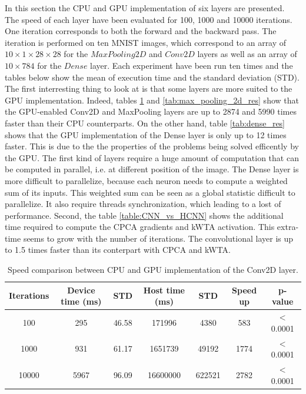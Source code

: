 \documentclass[11pt]{report}
\begin{document}
In this section the CPU and GPU implementation of six layers are presented. The speed of each layer have been evaluated for 100, 1000 and 10000 iterations. One iteration corresponds to both the forward and the backward pass. The iteration is performed on ten MNIST images, which correspond to an array of $10\times1\times28\times28$ for the $MaxPooling2D$ and $Conv2D$ layers as well as an array of $10\times784$ for the $Dense$ layer. Each experiment have been run ten times and the tables below show the mean of execution time and the standard deviation (STD).
\newline
\newline
\noindent The first interresting thing to look at is that some layers are more suited to the GPU implementation. Indeed, tables \ref{tab:conv2d_res} and \ref{tab:max_pooling_2d_res} show that the GPU-enabled Conv2D and MaxPooling layers are up to 2874 and 5990 times faster than their CPU counterparts. On the other hand, table \ref{tab:dense_res} shows that the GPU implementation of the Dense layer is only up to 12 times faster. This is due to the the properties of the problems being solved efficently by the GPU. The first kind of layers require a huge amount of  computation that can be computed in parallel, i.e. at different position of the image. The Dense layer is more difficult to parallelize, because each neuron needs to compute a weighted sum of its inputs. This weighted sum can be seen as a global statistic difficult to parallelize. It also require threads synchronization, which leading to a lost of performance.
\newline
\newline
\noindent Second, the table \ref{table:CNN_vs_HCNN} shows the additional time required to compute the CPCA gradients and kWTA activation. This extra-time seems to grow with the number of iterations. The convolutional layer is up to 1.5 times faster than its conterpart with CPCA and kWTA.

\begin{table}[h!]
\centering
\begin{tabular}{ c | c c | c c | c c }
Iterations & Device time (ms) & STD & Host time (ms) & STD & Speed up & p-value\\
\hline
100   & 295  & 46.58 & 171996   & 4380   & 583 & $<$ 0.0001 \\
1000  & 931  & 61.17 & 1651739  & 49192  & 1774 & $<$ 0.0001 \\
10000 & 5967 & 96.09 & 16600000 & 622521 & 2782 & $<$ 0.0001
\end{tabular}
\caption[Speed benchmark: Conv2D layer]{Speed comparison between CPU and GPU implementation of the Conv2D layer.}
\label{tab:conv2d_res}
\end{table}
\end{document}
